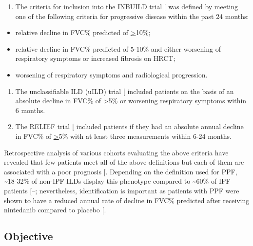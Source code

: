 \documentclass[
]{article}
\providecommand{\tightlist}{%
  \setlength{\itemsep}{0pt}\setlength{\parskip}{0pt}}
\begin{document}
\begin{enumerate}
\def\labelenumi{\arabic{enumi}.}
\setcounter{enumi}{1}
\tightlist
\item
  The criteria for inclusion into the INBUILD trial {[}\citeproc{ref-flaherty_nintedanib_2019}{19}{]} was defined by meeting one of the following criteria for progressive disease within the past 24 months:
\end{enumerate}

\begin{itemize}
\tightlist
\item
  relative decline in FVC\% predicted of \underline{>}10\%;
\item
  relative decline in FVC\% predicted of 5-10\% and either worsening of respiratory symptoms or increased fibrosis on HRCT;
\item
  worsening of respiratory symptoms and radiological progression.
\end{itemize}

\begin{enumerate}
\def\labelenumi{\arabic{enumi}.}
\setcounter{enumi}{2}
\item
  The unclassifiable ILD (uILD) trial {[}\citeproc{ref-maher_pirfenidone_2020}{20}{]} included patients on the basis of an absolute decline in FVC\% of \underline{>}5\% or worsening respiratory symptoms within 6 months.
\item
  The RELIEF trial {[}\citeproc{ref-behr_pirfenidone_2021}{21}{]} included patients if they had an absolute annual decline in FVC\% of \underline{>}5\% with at least three measurements within 6-24 months.
\end{enumerate}

Retrospective analysis of various cohorts evaluating the above criteria have revealed that few patients meet all of the above definitions but each of them are associated with a poor prognosis {[}\citeproc{ref-khor_patient_2023}{22}{]}. Depending on the definition used for PPF, \textasciitilde18-32\% of non-IPF ILDs display this phenotype compared to \textasciitilde60\% of IPF patients {[}--\citeproc{ref-rajan_progressive_2023}{27}{]}; nevertheless, identification is important as patients with PPF were shown to have a reduced annual rate of decline in FVC\% predicted after receiving nintedanib compared to placebo {[}\citeproc{ref-flaherty_nintedanib_2019}{19}{]}.

\subsection{Objective}\label{objective}
\end{document}
